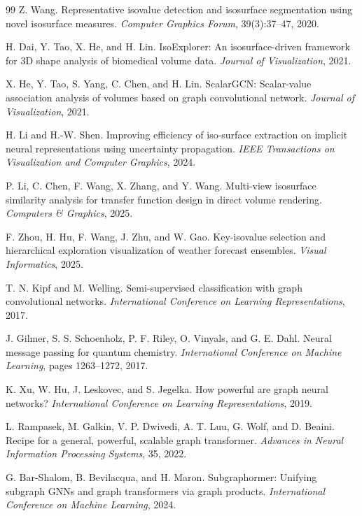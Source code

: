 \documentclass[twocolumn, a4paper, 10pt]{article}
\begin{document}
\begin{thebibliography}{99}
Z. Wang.
Representative isovalue detection and isosurface segmentation using novel isosurface measures.
\textit{Computer Graphics Forum}, 39(3):37--47, 2020.

H. Dai, Y. Tao, X. He, and H. Lin.
IsoExplorer: An isosurface-driven framework for 3D shape analysis of biomedical volume data.
\textit{Journal of Visualization}, 2021.

X. He, Y. Tao, S. Yang, C. Chen, and H. Lin.
ScalarGCN: Scalar-value association analysis of volumes based on graph convolutional network.
\textit{Journal of Visualization}, 2021.

H. Li and H.-W. Shen.
Improving efficiency of iso-surface extraction on implicit neural representations using uncertainty propagation.
\textit{IEEE Transactions on Visualization and Computer Graphics}, 2024.

P. Li, C. Chen, F. Wang, X. Zhang, and Y. Wang.
Multi-view isosurface similarity analysis for transfer function design in direct volume rendering.
\textit{Computers \& Graphics}, 2025.

F. Zhou, H. Hu, F. Wang, J. Zhu, and W. Gao.
Key-isovalue selection and hierarchical exploration visualization of weather forecast ensembles.
\textit{Visual Informatics}, 2025.


T. N. Kipf and M. Welling.
Semi-supervised classification with graph convolutional networks.
\textit{International Conference on Learning Representations}, 2017.

J. Gilmer, S. S. Schoenholz, P. F. Riley, O. Vinyals, and G. E. Dahl.
Neural message passing for quantum chemistry.
\textit{International Conference on Machine Learning}, pages 1263--1272, 2017.

K. Xu, W. Hu, J. Leskovec, and S. Jegelka.
How powerful are graph neural networks?
\textit{International Conference on Learning Representations}, 2019.

L. Rampasek, M. Galkin, V. P. Dwivedi, A. T. Luu, G. Wolf, and D. Beaini.
Recipe for a general, powerful, scalable graph transformer.
\textit{Advances in Neural Information Processing Systems}, 35, 2022.

G. Bar-Shalom, B. Bevilacqua, and H. Maron.
Subgraphormer: Unifying subgraph GNNs and graph transformers via graph products.
\textit{International Conference on Machine Learning}, 2024.


\end{thebibliography}
\end{document}

